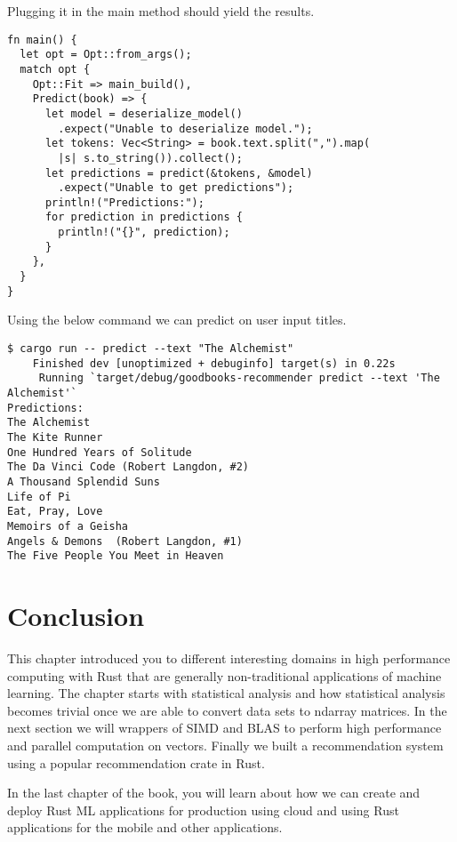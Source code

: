 \documentclass{book}
\begin{document}
Plugging it in the main method should yield the results.

\begin{lstlisting}[caption={chapter7/goodbooks-recommender/src/main.rs}, basicstyle=\small]
fn main() {
  let opt = Opt::from_args();
  match opt {
    Opt::Fit => main_build(),
    Predict(book) => {
      let model = deserialize_model()
        .expect("Unable to deserialize model.");
      let tokens: Vec<String> = book.text.split(",").map(
        |s| s.to_string()).collect();
      let predictions = predict(&tokens, &model)
        .expect("Unable to get predictions");
      println!("Predictions:");
      for prediction in predictions {
        println!("{}", prediction);
      }
    },
  }
}
\end{lstlisting}

Using the below command we can predict on user input titles.

\begin{lstlisting}[caption={chapter7/goodbooks-recommender/src/main.rs}, basicstyle=\small]
$ cargo run -- predict --text "The Alchemist"           
    Finished dev [unoptimized + debuginfo] target(s) in 0.22s
     Running `target/debug/goodbooks-recommender predict --text 'The Alchemist'`
Predictions:
The Alchemist
The Kite Runner
One Hundred Years of Solitude
The Da Vinci Code (Robert Langdon, #2)
A Thousand Splendid Suns
Life of Pi
Eat, Pray, Love
Memoirs of a Geisha
Angels & Demons  (Robert Langdon, #1)
The Five People You Meet in Heaven
\end{lstlisting}

\label{sub:Model Prediction}

\label{sec:recomender_systems}

\section{Conclusion}%

This chapter introduced you to different interesting domains in high performance computing with Rust that are generally non-traditional applications of machine learning. The chapter starts with statistical analysis and how statistical analysis becomes trivial once we are able to convert data sets to ndarray matrices. In the next section we will wrappers of SIMD and BLAS to perform high performance and parallel computation on vectors. Finally we built a recommendation system using a popular recommendation crate in Rust.

In the last chapter of the book, you will learn about how we can create and deploy Rust ML applications for production using cloud and using Rust applications for the mobile and other applications.
\label{sec:conclusion}

\printbibliography
\nocite{*}
\end{document}
